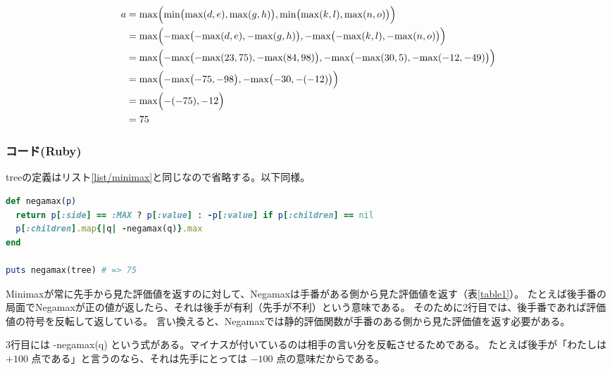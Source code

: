 \documentclass[11pt,a4paper]{ltjsarticle}
\begin{document}
\begin{equation}
  \begin{split}
    a &= \max\Bigl(
      \min\bigl(  
        \max(d, e), \max(g, h)
      \bigr),
      \min\bigl(   
        \max(k, l), \max(n, o) 
      \bigr)
    \Bigr) \\
    &= \max\Bigl(
      \mathrm{-max}\bigl(  
        \mathrm{-max}(d, e), \mathrm{-max}(g, h)
      \bigr),
      \mathrm{-max}\bigl(   
        \mathrm{-max}(k, l), \mathrm{-max}(n, o)
      \bigr)
    \Bigr) \\
    &= \max\Bigl(
      \mathrm{-max}\bigl(  
        \mathrm{-max}(23, 75), \mathrm{-max}(84, 98)
      \bigr),
      \mathrm{-max}\bigl(   
        \mathrm{-max}(30, 5), \mathrm{-max}(-12, -49)
      \bigr)
    \Bigr) \\
    &= \max\Bigl(
      \mathrm{-max}\bigl(  
        -75, -98
      \bigr),
       \mathrm{-max}\bigl(   
        -30, -(-12)
      \bigr)
    \Bigr) \\
    &= \max\Bigl(
      -(-75),
       -12
    \Bigr) \\
    &= 75
  \end{split}
\end{equation}


\subsubsection{コード(Ruby)}

treeの定義はリスト\ref{list/minimax}と同じなので省略する。以下同様。

\begin{lstlisting}[language=ruby,caption=negamax.rb,label=list/negamax]
def negamax(p)
  return p[:side] == :MAX ? p[:value] : -p[:value] if p[:children] == nil
  p[:children].map{|q| -negamax(q)}.max
end

puts negamax(tree) # => 75
\end{lstlisting}


Minimaxが常に先手から見た評価値を返すのに対して、Negamaxは手番がある側から見た評価値を返す（表\ref{table1}）。
たとえば後手番の局面でNegamaxが正の値が返したら、それは後手が有利（先手が不利）という意味である。
そのために2行目では、後手番であれば評価値の符号を反転して返している。
言い換えると、Negamaxでは静的評価関数が手番のある側から見た評価値を返す必要がある。

3行目には -negamax(q) という式がある。マイナスが付いているのは相手の言い分を反転させるためである。
たとえば後手が「わたしは $+100$ 点である」と言うのなら、それは先手にとっては $-100$ 点の意味だからである。
\end{document}
